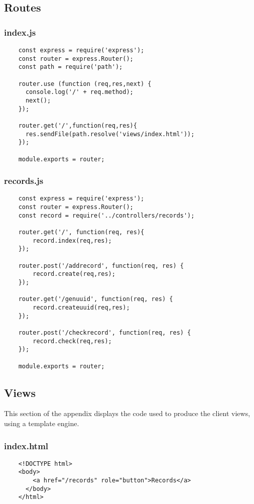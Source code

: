 \subsection{Routes}
\subsubsection{index.js}
\label{appendix:indexroute}
\begin{lstlisting}
    const express = require('express');
    const router = express.Router();
    const path = require('path');
    
    router.use (function (req,res,next) {
      console.log('/' + req.method);
      next();
    });
    
    router.get('/',function(req,res){
      res.sendFile(path.resolve('views/index.html'));
    });
    
    module.exports = router;    
\end{lstlisting}

\subsubsection{records.js}
\label{appendix:recordroute}
\begin{lstlisting}
    const express = require('express');
    const router = express.Router();
    const record = require('../controllers/records');
    
    router.get('/', function(req, res){
        record.index(req,res);
    });
    
    router.post('/addrecord', function(req, res) {
        record.create(req,res);
    });
    
    router.get('/genuuid', function(req, res) {
        record.createuuid(req,res);
    });
    
    router.post('/checkrecord', function(req, res) {
        record.check(req,res);
    });
    
    module.exports = router;     
\end{lstlisting}

\subsection{Views} 
\label{appendix:views}
This section of the appendix displays the code used to produce the client views, using a template engine. 
\subsubsection{index.html}
\begin{lstlisting}
    <!DOCTYPE html>
    <body>
        <a href="/records" role="button">Records</a>
      </body>
    </html>
    
\end{lstlisting}
